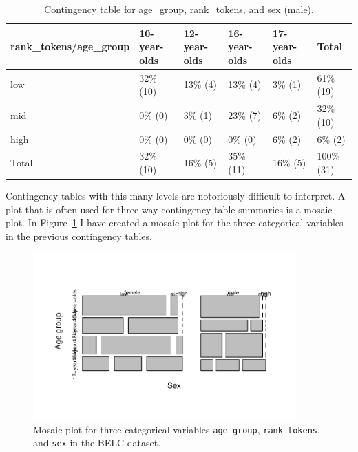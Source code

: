 \documentclass[
  letterpaper,
]{latex/krantz}
\begin{document}
\hypertarget{tbl-summaries-multivariate-categorical-table-belc-male}{}
\begin{table}
\caption{\label{tbl-summaries-multivariate-categorical-table-belc-male}Contingency table for age\_group, rank\_tokens, and sex (male). }\tabularnewline

\centering
\begin{tabular}{llllll}
\toprule
rank\_tokens/age\_group & 10-year-olds & 12-year-olds & 16-year-olds & 17-year-olds & Total\\
\midrule
low & 32\% (10) & 13\% (4) & 13\%  (4) & 3\% (1) & 61\% (19)\\
mid & 0\%  (0) & 3\% (1) & 23\%  (7) & 6\% (2) & 32\% (10)\\
high & 0\%  (0) & 0\% (0) & 0\%  (0) & 6\% (2) & 6\%  (2)\\
Total & 32\% (10) & 16\% (5) & 35\% (11) & 16\% (5) & 100\% (31)\\
\bottomrule
\end{tabular}
\end{table}

Contingency tables with this many levels are notoriously difficult to
interpret. A plot that is often used for three-way contingency table
summaries is a mosaic plot. In
Figure~\ref{fig-summaries-multivariate-mosaic-belc} I have created a
mosaic plot for the three categorical variables in the previous
contingency tables.

\begin{figure}[h]

{\centering \includegraphics[width=0.9\textwidth,height=\textheight]{./approaching-analysis_files/figure-pdf/fig-summaries-multivariate-mosaic-belc-1.pdf}

}

\caption{\label{fig-summaries-multivariate-mosaic-belc}Mosaic plot for
three categorical variables \texttt{age\_group}, \texttt{rank\_tokens},
and \texttt{sex} in the BELC dataset.}

\end{figure}
\end{document}

